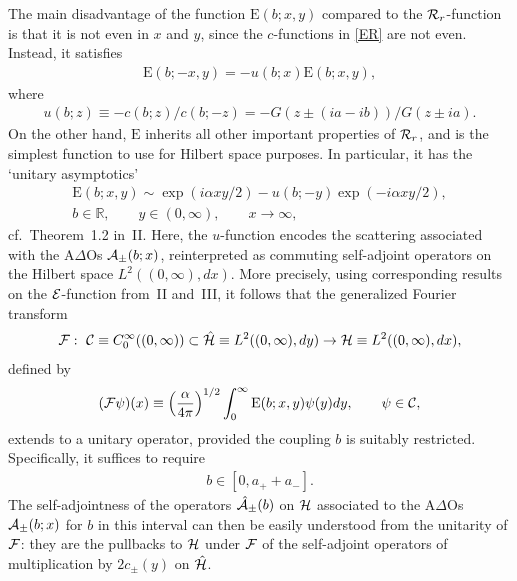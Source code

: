 \documentclass[11pt]{article}
\numberwithin{equation}{section}
\newcommand{\De}{\Delta}
\newcommand{\R}{{\mathbb R}}
\newcommand{\cE}{{\cal E}}
\newcommand{\cA}{{\cal A}}
\newcommand{\cR}{{\cal R}}
\newcommand{\cC}{{\cal C}}
\newcommand{\cF}{{\cal F}}
\newcommand{\cH}{{\cal H}}
\newcommand{\rE}{{\mathrm E}}
\begin{document}
The main disadvantage of the function $\rE(b;x,y)$ compared to the $\cR_r$-function is that it is not even in $x$ and $y$, since the $c$-functions in \eqref{ER} are not even. Instead, it satisf\/ies
\begin{gather}\label{Erefl}
\rE(b;-x,y)=-u(b;x)\rE(b;x,y),
\end{gather}
where
\begin{gather}\label{u}
u(b;z)\equiv -c(b;z)/c(b;-z)=-G(z\pm (ia-ib))/G(z\pm ia).
\end{gather}
On the other hand, $\rE$ inherits all other important properties of $\cR_r$, and is the simplest function to use for Hilbert space purposes. In particular, it has the `unitary asymptotics'
\begin{gather}\label{Eas}
\rE(b;x,y)\sim \exp(i\alpha xy/2)- u(b;-y)\exp(-i\alpha xy/2),\\
 b\in\R,\qquad y\in(0,\infty), \qquad x\to \infty,\nonumber
\end{gather}
cf.~Theorem~1.2 in~II. Here, the $u$-function
encodes the scattering associated with the A$\De$Os $\cA_{\pm}(b;x)$, reinterpreted as commuting self-adjoint operators on the Hilbert space $L^2((0,\infty),dx)$. More precisely, using corresponding results on the $\cE$-function from~II and~III, it follows that the generalized Fourier
transform
\begin{gather}\label{cF}
\cF
  : \ \cC\equiv C_0^{\infty}((0,\infty))\subset \hat{\cH}\equiv L^2((0,\infty),dy) \to\cH
\equiv L^2((0,\infty),dx),
\end{gather}
def\/ined by
\begin{gather}\label{cFE}
(\cF\psi)(x)\equiv\left(\frac{\alpha}{4\pi}\right)^{1/2}\int_0^{\infty}\rE(b;x,y)\psi(y)dy,\qquad
\psi\in\cC,
\end{gather}
extends to a unitary operator, provided the coupling $b$ is suitably restricted. Specif\/ically, it suf\/f\/ices to require
\begin{gather}\label{bres}
b\in [0,a_{+}+a_{-}].
\end{gather}
The self-adjointness of the operators $\hat{\cA}_{\pm}(b)$ on $\cH$ associated to the A$\De$Os $\cA_{\pm}(b;x)$ for $b$ in this interval can then be easily understood from the unitarity of $\cF$: they are the pullbacks to $\cH$ under $\cF$ of the self-adjoint operators of multiplication by $2c_{\pm}(y)$ on $\hat{\cH}$.
\end{document}
